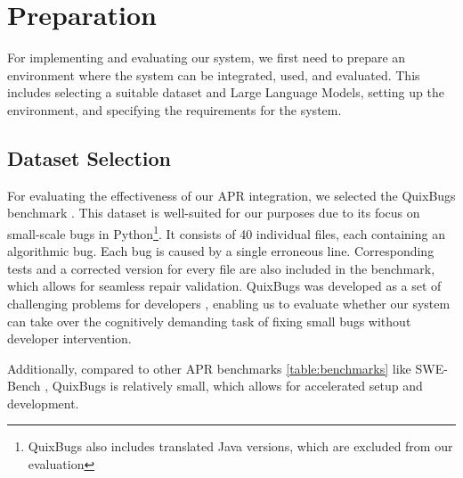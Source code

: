 \section{Preparation}

For implementing and evaluating our system, we first need to prepare an environment where the system can be integrated, used, and evaluated. This includes selecting a suitable dataset and Large Language Models, setting up the environment, and specifying the requirements for the system.

\subsection{Dataset Selection}

For evaluating the effectiveness of our APR integration, we selected the QuixBugs benchmark \cite{linQuixBugsMultilingualProgram2017}. This dataset is well-suited for our purposes due to its focus on small-scale bugs in Python\footnote{QuixBugs also includes translated Java versions, which are excluded from our evaluation}. It consists of 40 individual files, each containing an algorithmic bug. Each bug is caused by a single erroneous line. Corresponding tests and a corrected version for every file are also included in the benchmark, which allows for seamless repair validation. QuixBugs was developed as a set of challenging problems for developers \cite{linQuixBugsMultilingualProgram2017}, enabling us to evaluate whether our system can take over the cognitively demanding task of fixing small bugs without developer intervention.

Additionally, compared to other APR benchmarks \ref{table:benchmarks} like SWE-Bench \cite{jimenezSWEbenchCanLanguage2024}, QuixBugs is relatively small, which allows for accelerated setup and development.

